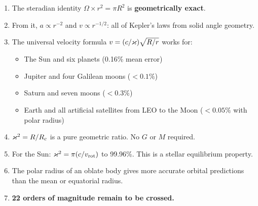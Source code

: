 \begin{enumerate}
  \item The steradian identity $\Omega \times r^2 = \pi R^2$ is \textbf{geometrically exact}.
  \item From it, $a \propto r^{-2}$ and $v \propto r^{-1/2}$: all of Kepler's laws from solid angle geometry.
  \item The universal velocity formula $v = (c/\varkappa)\sqrt{R/r}$ works for:
    \begin{itemize}
      \item The Sun and six planets (0.16\% mean error)
      \item Jupiter and four Galilean moons ($<0.1\%$)
      \item Saturn and seven moons ($<0.3\%$)
      \item Earth and all artificial satellites from LEO to the Moon ($<0.05\%$ with polar radius)
    \end{itemize}
  \item $\varkappa^2 = R/R_c$ is a pure geometric ratio.  No $G$ or $M$ required.
  \item For the Sun: $\varkappa^2 = \pi(c/v_{\text{rot}})$ to 99.96\%.  This is a stellar equilibrium property.
  \item The polar radius of an oblate body gives more accurate orbital predictions than the mean or equatorial radius.
  \item \textbf{22 orders of magnitude remain to be crossed.}
\end{enumerate}
